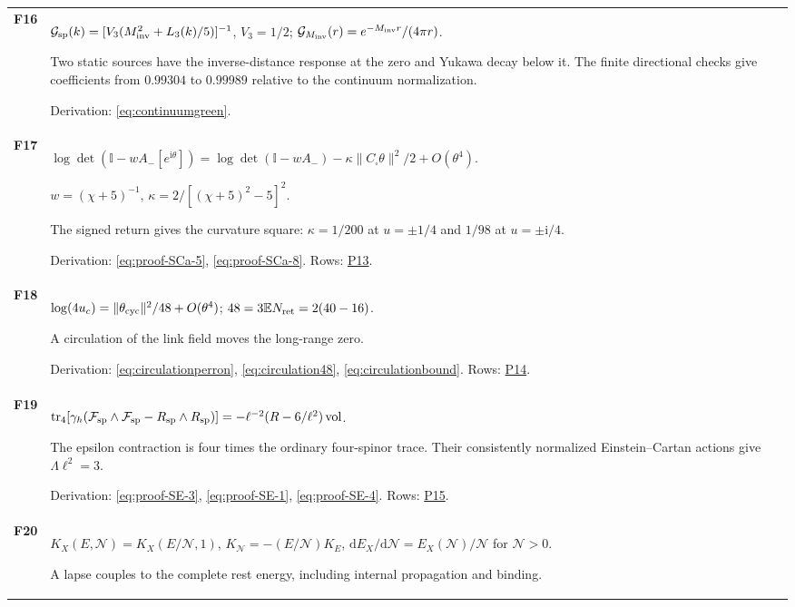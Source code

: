\documentclass[aps,prx,onecolumn,10pt,notitlepage,nofootinbib,longbibliography]{revtex4-2}
\numberwithin{equation}{section}
\numberwithin{table}{section}
\newcommand{\Id}{\mathbb I}
\newcommand{\EE}{\mathbb E}
\newcommand{\tr}{\operatorname{tr}}
\newcommand{\dd}{\mathrm d}
\newcommand{\ii}{\mathrm i}
\begin{document}
\begin{longtable}{@{}>{\raggedright\arraybackslash}p{}>{\raggedright\arraybackslash}p{}@{}}
\hypertarget{formula-F16}{}\textbf{F16}\label{formula:F16} & $\mathcal G_{\rm sp}(k)=[V_3(M_{\rm inv}^2+L_3(k)/5)]^{-1}$, $V_3=1/2$; $\mathcal G_{M_{\rm inv}}(r)=e^{-M_{\rm inv}r}/(4\pi r)$.\par
Two static sources have the inverse-distance response at the zero and Yukawa decay below it. The finite directional checks give coefficients from $0.99304$ to $0.99989$ relative to the continuum normalization.\par
Derivation: \eqref{eq:continuumgreen}. \\[7pt]
\hypertarget{formula-F17}{}\textbf{F17}\label{formula:F17} & $\log\det(\Id-wA_-[e^{\ii\theta}])=\log\det(\Id-wA_-)-\kappa\|C_\square\theta\|^2/2+O(\theta^4)$.\par $w=(\chi+5)^{-1}$, $\kappa=2/[(\chi+5)^2-5]^2$.\par
The signed return gives the curvature square: $\kappa=1/200$ at $u=\pm1/4$ and $1/98$ at $u=\pm\ii/4$.\par
Derivation: \eqref{eq:proof-SCa-5}, \eqref{eq:proof-SCa-8}. Rows: \hyperlink{row-P13}{P13}.\\[7pt]
\hypertarget{formula-F18}{}\textbf{F18}\label{formula:F18} & $\log(4u_c)=\|\theta_{\rm cyc}\|^2/48+O(\theta^4)$; $48=3\EE N_{\rm ret}=2(40-16)$.\par
A circulation of the link field moves the long-range zero.\par
Derivation: \eqref{eq:circulationperron}, \eqref{eq:circulation48}, \eqref{eq:circulationbound}. Rows: \hyperlink{row-P14}{P14}.\\[7pt]
\hypertarget{formula-F19}{}\textbf{F19}\label{formula:F19} & $\tr_4[\gamma_h(\mathcal F_{\rm sp}\wedge\mathcal F_{\rm sp}-R_{\rm sp}\wedge R_{\rm sp})]=-\ell^{-2}(R-6/\ell^2)\operatorname{vol}$.\par
The epsilon contraction is four times the ordinary four-spinor trace. Their consistently normalized Einstein--Cartan actions give $\Lambda\ell^2=3$.\par
Derivation: \eqref{eq:proof-SE-3}, \eqref{eq:proof-SE-1}, \eqref{eq:proof-SE-4}. Rows: \hyperlink{row-P15}{P15}.\\[7pt]
\hypertarget{formula-F20}{}\textbf{F20}\label{formula:F20} & $K_X(E,{\mathcal N})=K_X(E/{\mathcal N},1)$, $K_{\mathcal N}=-(E/{\mathcal N})K_E$, $\dd E_X/\dd {\mathcal N}=E_X({\mathcal N})/{\mathcal N}$ for ${\mathcal N}>0$.\par
A lapse couples to the complete rest energy, including internal propagation and binding.\par

\end{longtable}
\end{document}
